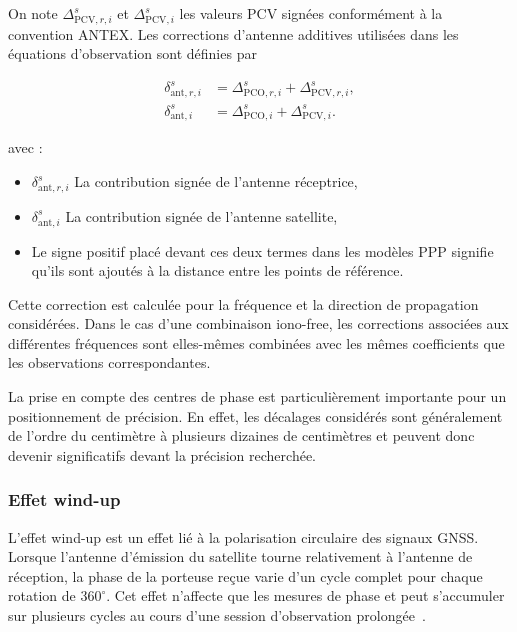 On note $\Delta_{\mathrm{PCV},r,i}^s$ et
$\Delta_{\mathrm{PCV},i}^{s}$ les valeurs PCV signées conformément à la
convention ANTEX. Les corrections d'antenne additives utilisées dans les
équations d'observation sont définies par

\begin{align}
\delta_{\mathrm{ant},r,i}^s
&=
\Delta_{\mathrm{PCO},r,i}^s+\Delta_{\mathrm{PCV},r,i}^s,
\\
\delta_{\mathrm{ant},i}^{s}
&=
\Delta_{\mathrm{PCO},i}^{s}+\Delta_{\mathrm{PCV},i}^{s}.
\label{eq:antenna_signed_corrections}
\end{align}

avec :

\begin{itemize}
    \item $\delta_{\mathrm{ant},r,i}^s$ La contribution signée de l'antenne
    réceptrice,
    \item $\delta_{\mathrm{ant},i}^{s}$ La contribution signée de l'antenne
    satellite,
    \item Le signe positif placé devant ces deux termes dans les modèles PPP
    signifie qu'ils sont ajoutés à la distance entre les points de référence.
\end{itemize}

Cette correction est calculée pour la fréquence et la direction de propagation
considérées. Dans le cas d'une combinaison iono-free, les corrections
associées aux différentes fréquences sont elles-mêmes combinées avec les
mêmes coefficients que les observations correspondantes.

La prise en compte des centres de phase est particulièrement importante pour
un positionnement de précision. En effet, les décalages considérés sont
généralement de l'ordre du centimètre à plusieurs dizaines de centimètres et
peuvent donc devenir significatifs devant la précision recherchée.

\subsubsection{Effet wind-up}\label{windup}

L'effet wind-up est un effet lié à la polarisation circulaire des signaux GNSS. Lorsque l'antenne d'émission du satellite tourne relativement à l'antenne de réception, la phase de la porteuse reçue varie d'un cycle complet pour chaque rotation de $360^\circ$. Cet effet n'affecte que les mesures de phase et peut s'accumuler sur plusieurs cycles au cours d'une session d'observation prolongée~\cite{wu1993}.

